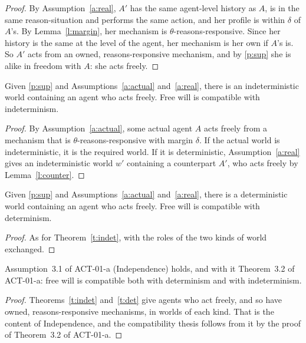 \documentclass{situationist-preprint}
\begin{document}
\begin{proof}
By Assumption~\ref{a:real}, $A'$ has the same agent-level history as $A$, is in the same reason-situation and performs the same action, and her profile is within $\delta$ of $A$'s. By Lemma~\ref{l:margin}, her mechanism is $\theta$-reasons-responsive. Since her history is the same at the level of the agent, her mechanism is her own if $A$'s is. So $A'$ acts from an owned, reasons-responsive mechanism, and by \ref{p:sup} she is alike in freedom with $A$: she acts freely.
\end{proof}

\begin{theorem}[Indeterminism]\label{t:indet}
Given \ref{p:sup} and Assumptions~\ref{a:actual} and~\ref{a:real}, there is an indeterministic world containing an agent who acts freely. Free will is compatible with indeterminism.
\end{theorem}

\begin{proof}
By Assumption~\ref{a:actual}, some actual agent $A$ acts freely from a mechanism that is $\theta$-reasons-responsive with margin $\delta$. If the actual world is indeterministic, it is the required world. If it is deterministic, Assumption~\ref{a:real} gives an indeterministic world $w'$ containing a counterpart $A'$, who acts freely by Lemma~\ref{l:counter}.
\end{proof}

\begin{theorem}[Determinism]\label{t:det}
Given \ref{p:sup} and Assumptions~\ref{a:actual} and~\ref{a:real}, there is a deterministic world containing an agent who acts freely. Free will is compatible with determinism.
\end{theorem}

\begin{proof}
As for Theorem~\ref{t:indet}, with the roles of the two kinds of world exchanged.
\end{proof}

\begin{corollary}\label{c:indep}
Assumption~3.1 of ACT-01-a (Independence) holds, and with it Theorem~3.2 of ACT-01-a: free will is compatible both with determinism and with indeterminism.
\end{corollary}

\begin{proof}
Theorems~\ref{t:indet} and~\ref{t:det} give agents who act freely, and so have owned, reasons-responsive mechanisms, in worlds of each kind. That is the content of Independence, and the compatibility thesis follows from it by the proof of Theorem~3.2 of ACT-01-a.
\end{proof}
\end{document}
